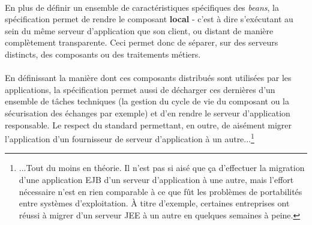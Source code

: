 {   \paragraph{} En plus de définir un ensemble de caractéristiques spécifiques des \textit{beans},
   la spécification permet de rendre le composant \textbf{local} - c'est à dire s'exécutant au sein
   du même serveur d'application que son client, ou distant de manière complètement transparente.
   Ceci permet donc de séparer, sur des serveurs distincts, des composants ou des traitements
   métiers.

   \paragraph{} En définissant la manière dont ces composants distribués sont utilisées par les
   applications, la spécification permet aussi de décharger ces dernières d'un ensemble de tâches
   techniques (la gestion du cycle de vie du composant ou la sécurisation des échanges par exemple)
   et d'en rendre le serveur d'application responsable. Le respect du standard permettant, en outre,
   de aisément migrer l'application d'un fournisseur de serveur d'application à un autre...\footnote{
   ...Tout du moins en théorie. Il n'est pas si aisé que ça d'effectuer la migration d'une application
   EJB d'un serveur d'application à une autre, mais l'effort nécessaire n'est en rien comparable à ce que
   fût les problèmes de portabilités entre systèmes d'exploitation. À titre d'exemple,
   certaines entreprises ont réussi à migrer d'un serveur JEE à un autre en quelques semaines à peine.}
}

